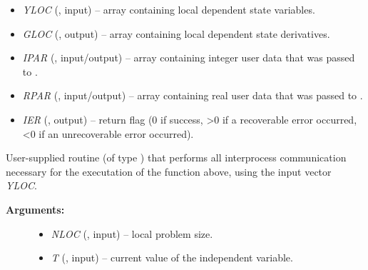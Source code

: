 \documentclass[letterpaper,10pt,english]{sphinxmanual}
\begin{document}
\begin{enumerate}
\begin{fulllineitems}
\begin{description}
\begin{itemize}
\item {} 
\emph{YLOC} (, input) -- array containing local
dependent state variables.

\item {} 
\emph{GLOC} (, output) -- array containing local
dependent state derivatives.

\item {} 
\emph{IPAR} (, input/output) -- array containing
integer user data that was passed to
{\hyperref[f_interface/Usage:f/_/FARKMALLOC]{}}.

\item {} 
\emph{RPAR} (, input/output) -- array containing
real user data that was passed to {\hyperref[f_interface/Usage:f/_/FARKMALLOC]{}}.

\item {} 
\emph{IER} (, output) -- return flag (0 if success, \textgreater{}0
if a recoverable error occurred, \textless{}0 if an unrecoverable
error occurred).

\end{itemize}

\end{description}

\end{fulllineitems}


\begin{fulllineitems}
\label{f_interface/Preconditioning:f/_/FARKCOMMFN}
User-supplied routine (of type {\hyperref[c_interface/Preconditioners:ARKCommFn]{}}) that
performs all interprocess communication necessary for the
executation of the {\hyperref[f_interface/Preconditioning:f/_/FARKGLOCFN]{}} function above, using
the input vector \emph{YLOC}.
\begin{description}
\item[{\textbf{Arguments:}}] \leavevmode\begin{itemize}
\item {} 
\emph{NLOC} (, input) -- local problem size.

\item {} 
\emph{T} (, input) -- current value of the
independent variable.


\end{itemize}
\end{description}
\end{fulllineitems}
\end{enumerate}
\end{document}
